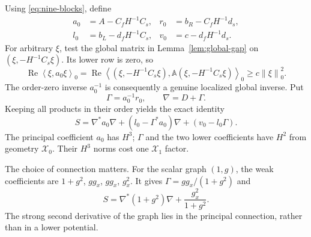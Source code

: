 \documentclass[11pt,a4paper]{article}
\numberwithin{equation}{section}
\theoremstyle{remark}
\newcommand{\norm}[1]{\left\lVert #1\right\rVert}
\newcommand{\ip}[2]{\left\langle #1,#2\right\rangle_0}
\newcommand{\Xzero}{\mathcal X_0}
\newcommand{\Xone}{\mathcal X_1}
\begin{document}
Using \eqref{eq:nine-blocks}, define
\[
 \begin{aligned}
 a_0&=A-C_fH^{-1}C_s,& r_0&=b_R-C_fH^{-1}d_s,\\
 l_0&=b_L-d_fH^{-1}C_s,& v_0&=c-d_fH^{-1}d_s .
 \end{aligned}
\]
For arbitrary \(\xi\), test the global matrix in
Lemma~\ref{lem:global-gap} on
\((\xi,-H^{-1}C_s\xi)\). Its lower row is zero, so
\[
 \operatorname{Re}\ip{\xi}{a_0\xi}
  =\operatorname{Re}\ip{(\xi,-H^{-1}C_s\xi)}
                         {\mathbb A(\xi,-H^{-1}C_s\xi)}
       \geq c\norm\xi_0^2 .
\]
The order-zero inverse \(a_0^{-1}\) is consequently a genuine
localized global inverse. Put
\begin{equation}\label{eq:connection}
 \Gamma=a_0^{-1}r_0,\qquad \nabla=D+\Gamma .
\end{equation}
Keeping all products in their order yields the exact identity
\begin{equation}\label{eq:weak-connection}
 S=\nabla^*a_0\nabla+(l_0-\Gamma^*a_0)\nabla+(v_0-l_0\Gamma).
\end{equation}
The principal coefficient \(a_0\) has \(H^3\); \(\Gamma\) and the
two lower coefficients have \(H^2\) from geometry \(\Xzero\).
Their \(H^3\) norms cost one \(\Xone\) factor.

The choice of connection matters. For the scalar graph \((1,g)\),
the weak coefficients are \(1+g^2\), \(gg_x\), \(gg_x\), \(g_x^2\).
It gives \(\Gamma=gg_x/(1+g^2)\) and
\[
 S=\nabla^*(1+g^2)\nabla+\frac{g_x^2}{1+g^2}.
\]
The strong second derivative of the graph lies in the principal
connection, rather than in a lower potential.
\end{document}
